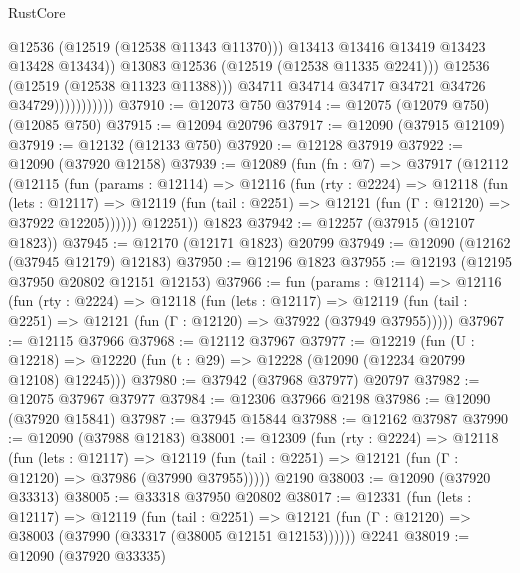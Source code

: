 \begin{lexlean}{RustCore}
\begin{coremodule}
                                    @12536
                                    (@12519 (@12538 @11343 @11370)))
                                  @13413
                                  @13416
                                  @13419
                                  @13423
                                  @13428
                                  @13434))
                              @13083
                              @12536
                              (@12519 (@12538 @11335 @2241)))
                            @12536
                            (@12519 (@12538 @11323 @11388)))
                          @34711
                          @34714
                          @34717
                          @34721
                          @34726
                          @34729)))))))))))
@37910 := @12073 @750
@37914 := @12075 (@12079 @750) (@12085 @750)
@37915 := @12094 @20796
@37917 := @12090 (@37915 @12109)
@37919 := @12132 (@12133 @750)
@37920 := @12128 @37919
@37922 := @12090 (@37920 @12158)
@37939 := @12089
    (fun (fn : @7) =>
    @37917
      (@12112
        (@12115
          (fun (params : @12114) =>
          @12116
            (fun (rty : @2224) =>
            @12118
              (fun (lets : @12117) =>
              @12119 (fun (tail : @2251) => @12121 (fun (Γ : @12120) => @37922 @12205))))))
        @12251))
    @1823
@37942 := @12257 (@37915 (@12107 @1823))
@37945 := @12170 (@12171 @1823) @20799
@37949 := @12090 (@12162 (@37945 @12179) @12183)
@37950 := @12196 @1823
@37955 := @12193 (@12195 @37950 @20802 @12151 @12153)
@37966 := fun (params : @12114) =>
  @12116
    (fun (rty : @2224) =>
    @12118
      (fun (lets : @12117) =>
      @12119 (fun (tail : @2251) => @12121 (fun (Γ : @12120) => @37922 (@37949 @37955)))))
@37967 := @12115 @37966
@37968 := @12112 @37967
@37977 := @12219
    (fun (U : @12218) => @12220 (fun (t : @29) => @12228 (@12090 (@12234 @20799 @12108) @12245)))
@37980 := @37942 (@37968 @37977) @20797
@37982 := @12075 @37967 @37977
@37984 := @12306 @37966 @2198
@37986 := @12090 (@37920 @15841)
@37987 := @37945 @15844
@37988 := @12162 @37987
@37990 := @12090 (@37988 @12183)
@38001 := @12309
    (fun (rty : @2224) =>
    @12118
      (fun (lets : @12117) =>
      @12119 (fun (tail : @2251) => @12121 (fun (Γ : @12120) => @37986 (@37990 @37955)))))
    @2190
@38003 := @12090 (@37920 @33313)
@38005 := @33318 @37950 @20802
@38017 := @12331
    (fun (lets : @12117) =>
    @12119
      (fun (tail : @2251) =>
      @12121 (fun (Γ : @12120) => @38003 (@37990 (@33317 (@38005 @12151 @12153))))))
    @2241
@38019 := @12090 (@37920 @33335)

\end{coremodule}
\end{lexlean}
